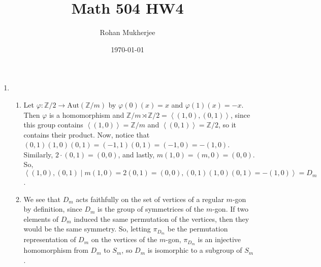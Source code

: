 \documentclass[12pt]{article}
\title{Math 504 HW4}
\date{\today}
\author{Rohan Mukherjee}
\theoremstyle{definitionstyle}
\def\mbb#1{\mathbb{#1}}
\def \cph{\varphi}
\newcommand{\Z}{\mbb Z}
\newcommand{\gen}[1]{\left\langle #1 \right\rangle}
\newcommand{\Aut}{\mathrm{Aut}}
\begin{document}
	\maketitle
	\begin{enumerate}[leftmargin=\labelsep]
		\item \begin{enumerate}
			\item Let $\cph: \Z/2 \to \Aut(\Z/m)$ by $\cph(0)(x) = x$ and $\cph(1)(x) = -x$. Then $\cph$ is a homomorphism and $\Z/m \rtimes \Z/2 = \gen{(1, 0), (0, 1)}$, since this group contains $\gen{(1, 0)} = \Z/m$ and $\gen{(0, 1)} = \Z/2$, so it contains their product. Now, notice that $(0,1)(1,0)(0,1) = (-1, 1)(0, 1) = (-1, 0) = -(1, 0)$. Similarly, $2 \cdot (0, 1) = (0, 0)$, and lastly, $m(1, 0) = (m, 0) = (0, 0)$. So, $\gen{(1, 0), (0, 1) \mid m(1, 0) = 2(0, 1) = (0, 0), (0, 1)(1, 0)(0, 1) = -(1, 0)} = D_m$.
			
			\item We see that $D_m$ acts faithfully on the set of vertices of a regular $m$-gon by definition, since $D_m$ is the group of symmetrices of the $m$-gon. If two elements of $D_m$ induced the same permutation of the vertices, then they would be the same symmetry. So, letting $\pi_{D_m}$ be the permutation representation of $D_m$ on the vertices of the $m$-gon, $\pi_{D_m}$ is an injective homomorphism from $D_m$ to $S_m$, so $D_m$ is isomorphic to a subgroup of $S_m$.
			

\end{enumerate}
\end{enumerate}
\end{document}
